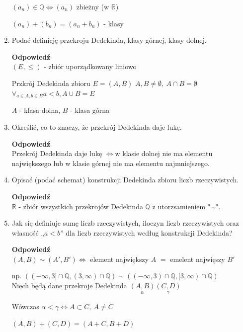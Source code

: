 \documentclass[12pt,a4paper]{article}
\theoremstyle{break}
\newcommand{\Odp}[1]{
		\begin{mdframed}[style=zadanie]
			\textbf{Odpowiedź}\\
			#1
		\end{mdframed}
	}
\newcommand{\witw}{$\Leftrightarrow$}
\begin{document}
\begin{enumerate}[1.]
{		$(a_n)\in \mathbb{Q} \Leftrightarrow (a_n)$ zbieżny (w $\mathbb{R}$)
		
		$(a_n)+(b_n)=(a_n + b_n)$ - klasy
	}
	\newpage
	\item Podać definicję przekroju Dedekinda, klasy górnej, klasy dolnej.
	\Odp{
		$(E,\leq)$ - zbiór uporządkowany liniowo
		
		Przkrój Dedekinda zbioru $E=(A,B)$
		$A,B\neq \emptyset, \: A\cap B = \emptyset$
		$\forall_{a\in A, b\in B} a<b, A\cup B=E$
		
		$A$ - klasa dolna, $B$ - klasa górna
	}
	
	\item Określić, co to znaczy, że przekrój Dedekinda daje lukę.
	\Odp{
		Przekrój Dedekinda daje lukę \witw w klasie dolnej nie ma elementu największego lub w klasie górnej nie ma elementu najmniejszego.
	}
	
	\item Opisać (podać schemat) konstrukcji Dedekinda zbioru liczb rzeczywistych.
	\Odp{
		$\mathbb{R}$ - zbiór wszystkich przekrojów Dedekinda $\mathbb{Q}$ z utorzsamieniem "$\sim$".
	}
	
	\item Jak się definiuje sumę liczb rzeczywistych, iloczyn liczb rzeczywistych oraz własność	„$a < b$” dla liczb rzeczywistych według konstrukcji Dedekinda?
	\Odp{
		$(A,B) \sim (A',B') \Leftrightarrow$ element największy $A$ $=$ emelent najwięszy $B'$
		
		np. $((-\infty,3]\cap\mathbb{Q},(3,\infty)\cap\mathbb{Q})\sim ((-\infty,3)\cap\mathbb{Q},[3,\infty)\cap\mathbb{Q}) $\\
		
		Niech będą dane przekroje Dedekinda $\underset{\alpha}{(A,B)} \underset{\gamma}{(C,D)}$ 
		
		Wówczas $\alpha<\gamma \Leftrightarrow A\subset C,\: A\neq C$
		
		$(A,B) + (C,D) = (A+C, B + D)$
	}
	

\end{enumerate}
\end{document}
